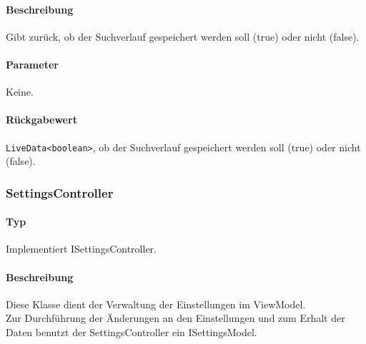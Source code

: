 \paragraph*{Beschreibung}
Gibt zurück, ob der Suchverlauf gespeichert werden soll (true) oder nicht (false).
\paragraph*{Parameter}
Keine.
\paragraph*{Rückgabewert}
\texttt{LiveData<boolean>}, ob der Suchverlauf gespeichert werden soll (true) oder nicht (false).

\subsubsection{SettingsController}
\paragraph*{Typ}
Implementiert ISettingsController.
\paragraph*{Beschreibung}
Diese Klasse dient der Verwaltung der Einstellungen im ViewModel. \\
Zur Durchführung der Änderungen an den Einstellungen und zum Erhalt der Daten benutzt der SettingsController ein ISettingsModel.
